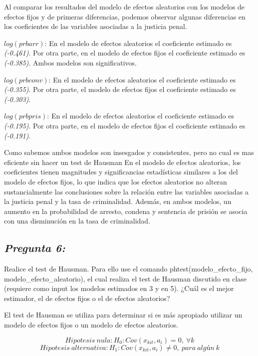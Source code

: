 \documentclass[
  12pt,
]{article}
\begin{document}
Al comparar los resultados del modelo de efectos aleatorios con los
modelos de efectos fijos y de primeras diferencias, podemos observar
algunas diferencias en los coeficientes de las variables asociadas a la
justicia penal.

\(log(prbarr)\): En el modelo de efectos aleatorios el coeficiente
estimado es \emph{(-0.461)}. Por otra parte, en el modelo de efectos
fijos el coeficiente estimado es \emph{(-0.385)}. Ambos modelos son
significativos.

\(log(prbconv)\): En el modelo de efectos aleatorios el coeficiente
estimado es \emph{(-0.355)}. Por otra parte, el modelo de efectos fijos
el coeficiente estimado es \emph{(-0.303)}.

\(log(prbpris)\): En el modelo de efectos aleatorios el coeficiente
estimado es \emph{(-0.195)}. Por otra parte, en el modelo de efectos
fijos el coeficiente estimado es \emph{(-0.191)}.

Como sabemos ambos modelos son insesgados y consistentes, pero no cual
es mas eficiente sin hacer un test de Hausman En el modelo de efectos
aleatorios, los coeficientes tienen magnitudes y significancias
estadísticas similares a los del modelo de efectos fijos, lo que indica
que los efectos aleatorios no alteran sustancialmente las conclusiones
sobre la relación entre las variables asociadas a la justicia penal y la
tasa de criminalidad. Además, en ambos modelos, un aumento en la
probabilidad de arresto, condena y sentencia de prisión se asocia con
una disminución en la tasa de criminalidad.

\subsection{\texorpdfstring{\textbf{\emph{Pregunta
6:}}}{Pregunta 6:}}\label{pregunta-6}

Realice el test de Hausman. Para ello use el comando
phtest(modelo\_efecto\_fijo, modelo\_efecto\_aleatorio), el cual realiza
el test de Hausman discutido en clase (requiere como input los modelos
estimados en 3 y en 5). ¿Cuál es el mejor estimador, el de efectos fijos
o el de efectos aleatorios?

El test de Hausman se utiliza para determinar si es más apropiado
utilizar un modelo de efectos fijos o un modelo de efectos aleatorios.

\[Hipotesis\ nula: H_0 : Cov(x_{kit},a_i ) = 0 ,\  \forall k\]
\[Hipotesis\ alternativa: H_1 : Cov(x_{kit},a_i ) \neq 0, \ para \ algún \ k \]
\end{document}
